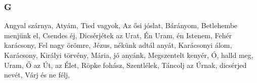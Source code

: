\begin{multicols}{2}
\begin{minipage}{\textwidth}
\subsubsection*{G}
Angyal szárnya, \pageref{AngyalszC3A1rnya}\newline
Atyám, Tied vagyok, \pageref{AtyC3A1m2CTiedvagyok}\newline
Az ősi jóslat, \pageref{AzC591sijC3B3slat}\newline
Bárányom, \pageref{BC3A1rC3A1nyom}\newline
Betlehembe menjünk el, \pageref{BetlehembemenjC3BCnkel}\newline
Csendes éj, \pageref{CsendesC3A9j}\newline
Dicsérjétek az Urat, \pageref{DicsC3A9rjC3A9tekazUrat}\newline
Én Uram, én Istenem, \pageref{C389nUram2CC3A9nIstenem}\newline
Fehér karácsony, \pageref{FehC3A9rkarC3A1csony}\newline
Fel nagy örömre, \pageref{FelnagyC3B6rC3B6mre}\newline
Jézus, nékünk adtál anyát, \pageref{JC3A9zus2CnC3A9kC3BCnkadtC3A1lanyC3A1t}\newline
Karácsonyi álom, \pageref{KarC3A1csonyiC3A1lom}\newline
Karácsony, \pageref{KarC3A1csony}\newline
Királyi törvény, \pageref{KirC3A1lyitC3B6rvC3A9ny}\newline
Mária, jó anyánk, \pageref{MC3A1ria2CjC3B3anyC3A1nk}\newline
Megszentelt kenyér, \pageref{MegszenteltkenyC3A9r}\newline
Ó, halld meg, Uram, \pageref{C3932Challdmeg2CUram}\newline
Ő az Út, az Élet, \pageref{C590azC39At2CazC389let}\newline
Röpke fohász, \pageref{RC3B6pkefohC3A1sz}\newline
Szentlélek, \pageref{SzentlC3A9lek}\newline
Táncolj az Úrnak, dicsérjed nevét, \pageref{TC3A1ncoljazC39Arnak2CdicsC3A9rjednevC3A9t}\newline
Várj és ne félj, \pageref{VC3A1rjC3A9snefC3A9lj}\newline

\end{minipage}
\begin{minipage}{\textwidth}

\end{minipage}
\end{multicols}
